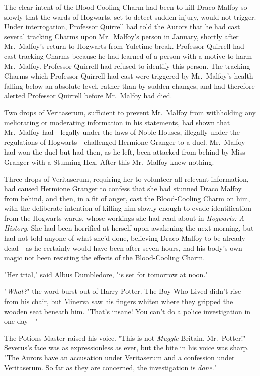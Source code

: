 The clear intent of the Blood-Cooling Charm had been to kill Draco Malfoy so 
slowly that the wards of Hogwarts, set to detect sudden injury, would not 
trigger. Under interrogation, Professor Quirrell had told the Aurors that he 
had cast several tracking Charms upon Mr.~Malfoy's person in January, shortly 
after Mr.~Malfoy's return to Hogwarts from Yuletime break. Professor Quirrell 
had cast tracking Charms because he had learned of a person with a motive to 
harm Mr.~Malfoy. Professor Quirrell had refused to identify this person. The 
tracking Charms which Professor Quirrell had cast were triggered by 
Mr.~Malfoy's health falling below an absolute level, rather than by sudden 
changes, and had therefore alerted Professor Quirrell before Mr.~Malfoy had 
died.

Two drops of Veritaserum, sufficient to prevent Mr.~Malfoy from withholding any 
meliorating or moderating information in his statements, had shown that 
Mr.~Malfoy had---legally under the laws of Noble Houses, illegally under the 
regulations of Hogwarts---challenged Hermione Granger to a duel. Mr.~Malfoy had 
won the duel but had then, as he left, been attacked from behind by Miss 
Granger with a Stunning Hex. After this Mr.~Malfoy knew nothing.

Three drops of Veritaserum, requiring her to volunteer all relevant 
information, had caused Hermione Granger to confess that she had stunned Draco 
Malfoy from behind, and then, in a fit of anger, cast the Blood-Cooling Charm 
on him, with the deliberate intention of killing him slowly enough to evade 
identification from the Hogwarts wards, whose workings she had read about in 
\emph{Hogwarts: A History}. She had been horrified at herself upon awakening 
the next morning, but had not told anyone of what she'd done, believing Draco 
Malfoy to be already dead---as he certainly would have been after seven hours, 
had his body's own magic not been resisting the effects of the Blood-Cooling 
Charm.

"Her trial," said Albus Dumbledore, "is set for tomorrow at noon."

"\emph{What?}" the word burst out of Harry Potter. The Boy-Who-Lived didn't 
rise from his chair, but Minerva saw his fingers whiten where they gripped the 
wooden seat beneath him. "That's insane! You can't do a police investigation in 
one day---"

The Potions Master raised his voice. "This is not \emph{Muggle} Britain, 
Mr.~Potter!" Severus's face was as expressionless as ever, but the bite in his 
voice was sharp. "The Aurors have an accusation under Veritaserum and a 
confession under Veritaserum. So far as they are concerned, the investigation 
is \emph{done}."

